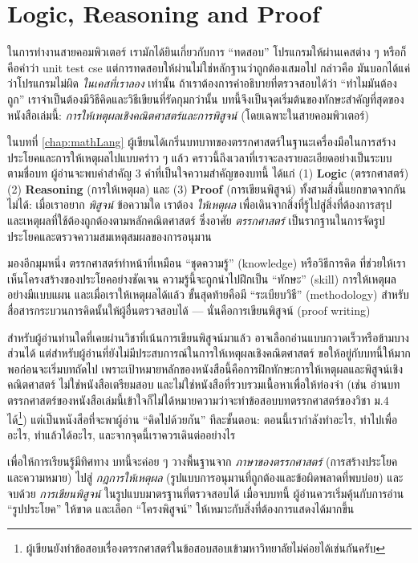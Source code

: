 \chapter{Logic, Reasoning and Proof}
ในการทำงานสายคอมพิวเตอร์ เรามักได้ยินเกี่ยวกับการ “ทดสอบ” โปรแกรมให้ผ่านเคสต่าง ๆ หรือก็คือคำว่า unit test cse แต่การทดสอบให้ผ่านไม่ใช่หลักฐานว่าถูกต้องเสมอไป กล่าวคือ มันบอกได้แค่ว่าโปรแกรมไม่ผิด \emph{ในเคสที่เราลอง} เท่านั้น
ถ้าเราต้องการคำอธิบายที่ตรวจสอบได้ว่า “ทำไมมันต้องถูก” เราจำเป็นต้องมีวิธีคิดและวิธีเขียนที่รัดกุมกว่านั้น
บทนี้จึงเป็นจุดเริ่มต้นของทักษะสำคัญที่สุดของหนังสือเล่มนี้: \emph{การให้เหตุผลเชิงคณิตศาสตร์และการพิสูจน์} (โดยเฉพาะในสายคอมพิวเตอร์)

ในบทที่ \ref{chap:mathLang} ผู้เขียนได้เกริ่นบทบาทของตรรกศาสตร์ในฐานะเครื่องมือในการสร้างประโยคและการให้เหตุผลไปแบบคร่าว ๆ แล้ว
คราวนี้ถึงเวลาที่เราจะลงรายละเอียดอย่างเป็นระบบ
ตามชื่อบท ผู้อ่านจะพบคำสำคัญ 3 คำที่เป็นใจความสำคัญของบทนี้ ได้แก่ (1) \textbf{Logic} (ตรรกศาสตร์) (2) \textbf{Reasoning} (การให้เหตุผล) และ (3) \textbf{Proof} (การเขียนพิสูจน์)
ทั้งสามสิ่งนี้แยกขาดจากกันไม่ได้: เมื่อเราอยาก \emph{พิสูจน์} ข้อความใด เราต้อง \emph{ให้เหตุผล} เพื่อเดินจากสิ่งที่รู้ไปสู่สิ่งที่ต้องการสรุป และเหตุผลที่ใช้ต้องถูกต้องตามหลักคณิตศาสตร์ ซึ่งอาศัย \emph{ตรรกศาสตร์} เป็นรากฐานในการจัดรูปประโยคและตรวจความสมเหตุสมผลของการอนุมาน

มองอีกมุมหนึ่ง ตรรกศาสตร์ทำหน้าที่เหมือน “ชุดความรู้” (knowledge) หรือวิธีการคิด ที่ช่วยให้เราเห็นโครงสร้างของประโยคอย่างชัดเจน
ความรู้นี้จะถูกนำไปฝึกเป็น “ทักษะ” (skill) การให้เหตุผลอย่างมีแบบแผน
และเมื่อเราให้เหตุผลได้แล้ว ขั้นสุดท้ายคือมี “ระเบียบวิธี” (methodology) สำหรับสื่อสารกระบวนการคิดนั้นให้ผู้อื่นตรวจสอบได้ --- นั่นคือการเขียนพิสูจน์ (proof writing)

สำหรับผู้อ่านท่านใดที่เคยผ่านวิชาที่เน้นการเขียนพิสูจน์มาแล้ว อาจเลือกอ่านแบบกวาดเร็วหรือข้ามบางส่วนได้
แต่สำหรับผู้อ่านที่ยังไม่มีประสบการณ์ในการให้เหตุผลเชิงคณิตศาสตร์ ขอให้อยู่กับบทนี้ให้มากพอก่อนจะเริ่มบทถัดไป
เพราะเป้าหมายหลักของหนังสือนี้คือการฝึกทักษะการให้เหตุผลและพิสูจน์เชิงคณิตศาสตร์ ไม่ใช่หนังสือเตรียมสอบ และไม่ใช่หนังสือที่รวบรวมเนื้อหาเพื่อให้ท่องจำ
(เช่น อ่านบทตรรกศาสตร์ของหนังสือเล่มนี้เข้าใจก็ไม่ได้หมายความว่าจะทำข้อสอบบทตรรกศาสตร์ของวิชา ม.4 ได้\footnote{ผู้เขียนยังทำข้อสอบเรื่องตรรกศาสตร์ในข้อสอบสอบเข้ามหาวิทยาลัยไม่ค่อยได้เช่นกันครับ})
แต่เป็นหนังสือที่จะพาผู้อ่าน “คิดไปด้วยกัน” ทีละขั้นตอน: ตอนนี้เรากำลังทำอะไร, ทำไปเพื่ออะไร, ทำแล้วได้อะไร, และจากจุดนี้เราควรเดินต่ออย่างไร

เพื่อให้การเรียนรู้มีทิศทาง บทนี้จะค่อย ๆ วางพื้นฐานจาก \emph{ภาษาของตรรกศาสตร์} (การสร้างประโยคและความหมาย)
ไปสู่ \emph{กฎการให้เหตุผล} (รูปแบบการอนุมานที่ถูกต้องและข้อผิดพลาดที่พบบ่อย)
และจบด้วย \emph{การเขียนพิสูจน์} ในรูปแบบมาตรฐานที่ตรวจสอบได้
เมื่อจบบทนี้ ผู้อ่านควรเริ่มคุ้นกับการอ่าน “รูปประโยค” ให้ขาด และเลือก “โครงพิสูจน์” ให้เหมาะกับสิ่งที่ต้องการแสดงได้มากขึ้น

